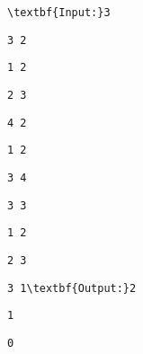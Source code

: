 \begin{verbatim}
\textbf{Input:}3\end{verbatim}
\begin{verbatim}
3 2\end{verbatim}
\begin{verbatim}
1 2\end{verbatim}
\begin{verbatim}
2 3\end{verbatim}
\begin{verbatim}
4 2\end{verbatim}
\begin{verbatim}
1 2\end{verbatim}
\begin{verbatim}
3 4\end{verbatim}
\begin{verbatim}
3 3\end{verbatim}
\begin{verbatim}
1 2\end{verbatim}
\begin{verbatim}
2 3\end{verbatim}
\begin{verbatim}
3 1\textbf{Output:}2\end{verbatim}
\begin{verbatim}
1\end{verbatim}
\begin{verbatim}
0\end{verbatim}